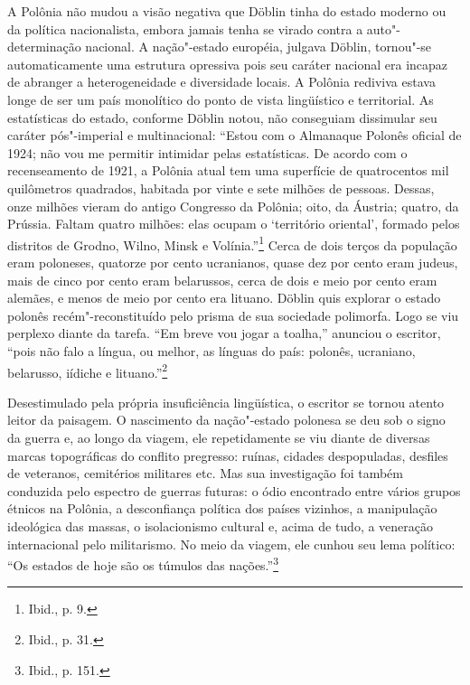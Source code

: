 A Polônia não mudou a visão negativa que Döblin tinha do estado moderno
ou da política nacionalista, embora jamais tenha se virado contra a
auto"-determinação nacional. A nação"-estado européia, julgava Döblin,
tornou"-se automaticamente uma estrutura opressiva pois seu caráter
nacional era incapaz de abranger a heterogeneidade e diversidade locais.
A Polônia rediviva estava longe de ser um país monolítico do ponto de
vista lingüístico e territorial. As estatísticas do estado, conforme
Döblin notou, não conseguiam dissimular seu caráter pós"-imperial e
multinacional: ``Estou com o Almanaque Polonês oficial de 1924; não vou
me permitir intimidar pelas estatísticas. De acordo com o recenseamento
de 1921, a Polônia atual tem uma superfície de quatrocentos mil
quilômetros quadrados, habitada por vinte e sete milhões de pessoas.
Dessas, onze milhões vieram do antigo Congresso da Polônia; oito, da
Áustria; quatro, da Prússia. Faltam quatro milhões: elas ocupam o
`território oriental', formado pelos distritos de Grodno, Wilno, Minsk e
Volínia.''\footnote{Ibid., p. 9.} Cerca de dois terços da população eram
poloneses, quatorze por cento ucranianos, quase dez por cento eram
judeus, mais de cinco por cento eram belarussos, cerca de dois e meio
por cento eram alemães, e menos de meio por cento era lituano. Döblin
quis explorar o estado polonês recém"-reconstituído pelo prisma de sua
sociedade polimorfa. Logo se viu perplexo diante da tarefa. ``Em breve
vou jogar a toalha,'' anunciou o escritor, ``pois não falo a língua, ou
melhor, as línguas do país: polonês, ucraniano, belarusso, iídiche e
lituano.''\footnote{Ibid., p. 31.}

%

Desestimulado pela própria insuficiência lingüística, o escritor se
tornou atento leitor da paisagem. O nascimento da nação"-estado polonesa
se deu sob o signo da guerra e, ao longo da viagem, ele repetidamente se
viu diante de diversas marcas topográficas do conflito pregresso:
ruínas, cidades despopuladas, desfiles de veteranos, cemitérios
militares etc. Mas sua investigação foi também conduzida pelo espectro
de guerras futuras: o ódio encontrado entre vários grupos étnicos na
Polônia, a desconfiança política dos países vizinhos, a manipulação
ideológica das massas, o isolacionismo cultural e, acima de tudo, a
veneração internacional pelo militarismo. No meio da viagem, ele cunhou
seu lema político: ``Os estados de hoje são os túmulos das
nações.''\footnote{Ibid., p. 151.}

